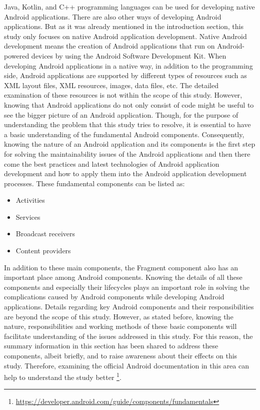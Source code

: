 Java, Kotlin, and C++ programming languages can be used for developing native Android applications. There are also other ways of developing Android applications. But as it was already mentioned in the introduction section, this study only focuses on native Android application development. Native Android development means the creation of Android applications that run on Android-powered devices by using the Android Software Development Kit. When developing Android applications in a native way, in addition to the programming side, Android applications are supported by different types of resources such as XML layout files, XML resources, images, data files, etc. The detailed examination of these resources is not within the scope of this study. However, knowing that Android applications do not only consist of code might be useful to see the bigger picture of an Android application. Though, for the purpose of understanding the problem that this study tries to resolve, it is essential to have a basic understanding of the fundamental Android components. Consequently, knowing the nature of an Android application and its components is the first step for solving the maintainability issues of the Android applications and then there come the best practices and latest technologies of Android application development and how to apply them into the Android application development processes. These fundamental components can be listed as:
\begin{itemize}
    \item Activities
    \item Services
    \item Broadcast receivers
    \item Content providers
\end{itemize}

In addition to these main components, the Fragment component also has an important place among Android components. Knowing the details of all these components and especially their lifecycles plays an important role in solving the complications caused by Android components while developing Android applications. Details regarding key Android components and their responsibilities are beyond the scope of this study. However, as stated before, knowing the nature, responsibilities and working methods of these basic components will facilitate understanding of the issues addressed in this study. For this reason, the summary information in this section has been shared to address these components, albeit briefly, and to raise awareness about their effects on this study. Therefore, examining the official Android documentation in this area can help to understand the study better \footnote{\url{https://developer.android.com/guide/components/fundamentals}}.

